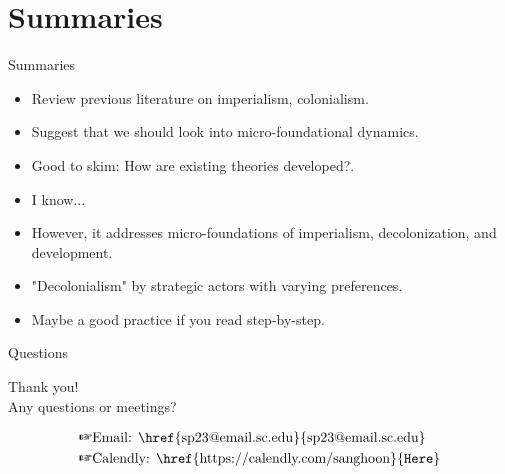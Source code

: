 \documentclass[xcolor=dvipsnames]{beamer}
\begin{document}
	\section{Summaries}
	\begin{frame}[fragile]{Summaries}
		\cite{DeJuan2017}\pause
		\begin{itemize}
			\item Review previous literature on imperialism, colonialism.
			\item Suggest that we should look into micro-foundational dynamics.
			\item Good to skim: How are existing theories developed?.
		\end{itemize}\pause
		\cite{Gartzke2011}\pause
		\begin{itemize}
			\item I know...
			\item However, it addresses micro-foundations of imperialism, decolonization, and development.
			\item "Decolonialism" by strategic actors with varying preferences.
			\item Maybe a good practice if you read step-by-step.
		\end{itemize}
	\end{frame}
	
	\begin{frame}[fragile]{Questions}
		\begin{center}
			{\huge Thank you!}\\
			\bigskip		
			Any questions or meetings?\\
		\end{center}
		\begin{equation*}
			\begin{aligned}
				\text{\ding{43}}& \text{Email: \href{sp23@email.sc.edu}{sp23@email.sc.edu}}\\
				\text{\ding{43}}& \text{Calendly: \href{https://calendly.com/sanghoon}{\texttt{Here}}}
			\end{aligned}
		\end{equation*}
	\end{frame}
	
	\begin{frame}{}
		
		
	\end{frame}
\end{document}
